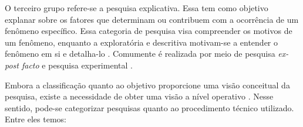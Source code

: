  \par
  \indent O terceiro grupo refere-se a pesquisa explicativa. Essa tem como objetivo explanar sobre os fatores que determinam ou contribuem com  a ocorrência de um fenômeno específico. Essa categoria de pesquisa visa compreender os motivos de um fenômeno, enquanto a exploratória e descritiva motivam-se a entender o fenômeno em si e detalha-lo \cite{gil2002}. Comumente é realizada por meio de pesquisa  \textit{ex-post facto} e pesquisa experimental \cite{tafner2007}.

 \par
 \indent Embora a classificação quanto ao objetivo proporcione uma visão conceitual da pesquisa, existe a necessidade de obter uma visão a nível operativo \cite{gil2002}. Nesse sentido, pode-se categorizar pesquisas quanto ao procedimento técnico utilizado. Entre eles temos:
 
